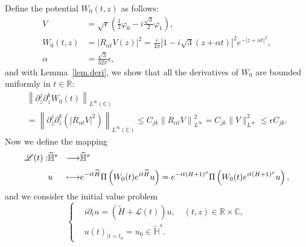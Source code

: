 \documentclass[10pt]{amsart}
\theoremstyle{definition}\newtheorem{defi}[theo]{Definition}\newtheorem{rema}[theo]{Remark}\newtheorem{exam}[theo]{Example}\newtheorem{exem}[theo]{Example}\newtheorem{nota}[theo]{Notation}
\newcommand{\C}{\mathbb{C}}
\newcommand{\R}{\mathbb{R}}
\newcommand{\HH}{\mathbb{H}}
\renewcommand{\L}{\mathscr{L}}
\newcommand*\eps{\epsilon}
\newcommand*\dis{\displaystyle}
\newcommand{\ov}{\overline}
\newcommand{\wt}{\widetilde}
\newcommand{\<}{\langle}
\renewcommand{\>}{\rangle}
\renewcommand{\phi}{\varphi}
\begin{document}
Define the potential $W_0(t,z)$ as follows:
\begin{align*}
V &=\sqrt{\eps}\left(\frac12\phi_0-i\frac{\sqrt{3}}2\phi_1\right), \\
W_0(t,z)&=\left|R_{\alpha t}V(z)\right|^2=\frac{\eps}{4\pi}\left| 1-i\sqrt{3}(z+\alpha t) \right|^2e^{-|z+\alpha t|^2}, \\
 \alpha &=\frac{\sqrt{3}}{32 \pi} \eps,
\end{align*}
and with Lemma~\ref{lem.deri}, we show that all the derivatives of $W_0$ are bounded uniformly in $t\in \R$:
\begin{multline}\label{bk2}
\left\|\partial^j_{\ov z } \partial^k_z W_0(t)\right\|_{L^{\infty}(\C)}\\
= \left\|\partial^j_{\ov z } \partial^k_z \left(\left|R_{\alpha t}V\right|^2\right) \right\|_{L^{\infty}(\C)} \leq C_{jk} \left\| R_{\alpha t}V\right\|^2_{L^\infty} = C_{jk} \| V\|^2_{L^\infty} \leq \eps C_{jk}.
\end{multline}
Now we define the mapping
\begin{equation}\label{def-L}
\begin{aligned}
\L(t) : &\widetilde{\HH}^{s}&\longrightarrow&\widetilde{\HH}^{s}\\[3pt]
\dis & u &\longmapsto & e^{-it \wt{H}} \Pi\left(W_0(t)e^{it \wt{H}} u\right)= e^{-it (H+1)^{\rho}} \Pi\left(W_0(t)e^{it (H+1)^{\rho}} u\right),
\end{aligned}
\end{equation}
and we consider the initial value problem
\begin{equation}\label{le-pb}
\begin{cases}
&i\partial_t u=\left(\wt{H}+\L(t) \right)u, \quad (t,z)\in \R\times \C,\\
&u(t)_{|t=t_0}= u_0 \in \widetilde{\HH}^{s}.
\end{cases}
\end{equation}
\end{document}
